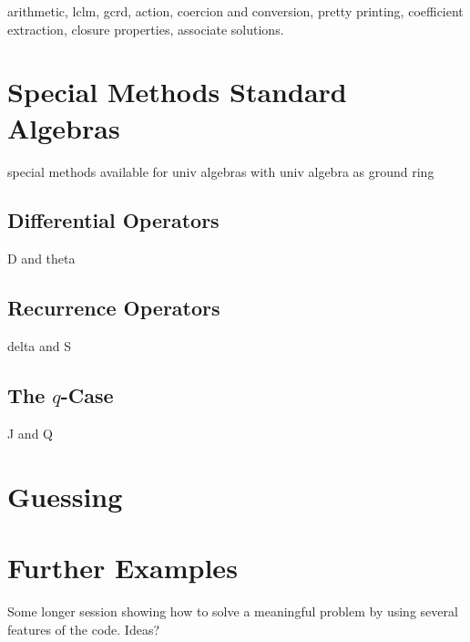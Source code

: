 \documentclass{amsart}
\begin{document}
arithmetic, lclm, gcrd, action, coercion and conversion, pretty printing, coefficient extraction,
closure properties, associate solutions. 

\section{Special Methods Standard Algebras}

special methods available for univ algebras with univ algebra as ground ring

\subsection{Differential Operators}

D and theta

\subsection{Recurrence Operators}

delta and S

\subsection{The $q$-Case}

J and Q

\section{Guessing}

\section{Further Examples}

Some longer session showing how to solve a meaningful problem by using several features of the code. Ideas?

\subsection{}

\subsection{}

 
 
 
\end{document}
